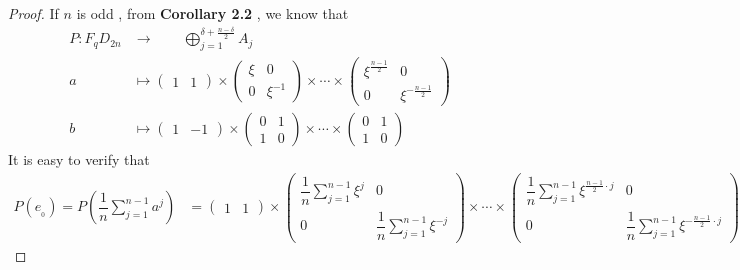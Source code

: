 \documentclass{article}
\begin{document}
\begin{proof}
    If $n$ is odd , from \textbf{Corollary 2.2} , we know that
    \begin{align*}
        P:F_qD_{2n}&\longrightarrow\qquad\mathop{\bigoplus}\limits_{j=1}^{\delta+\frac{n-\delta}{2}}A_j\\
        a\quad&\longmapsto\begin{pmatrix}
            1&1
        \end{pmatrix}
        \times
        \begin{pmatrix}
            \xi&0\\
            0&\xi^{\scriptscriptstyle-1}
        \end{pmatrix}
        \times\cdots\times
        \begin{pmatrix}
            \xi^{\frac{n-1}{2}}&0\\
            0&\xi^{-\frac{n-1}{2}}
        \end{pmatrix}\\
        b\quad&\longmapsto\begin{pmatrix}
            1&-1
        \end{pmatrix}
        \times
        \begin{pmatrix}
            0&1\\
            1&0
        \end{pmatrix}
         \times\cdots\times
        \begin{pmatrix}
            0&1\\
            1&0
        \end{pmatrix}
    \end{align*}
    It is easy to verify that
    \begin{align*}
    P(e_{_0})=P(\dfrac{1}{n}\sum_{j=1}^{n-1}a^{j})&=\begin{pmatrix}
        1&1
    \end{pmatrix}
    \times
        \begin{pmatrix}
            \dfrac{1}{n}\sum\limits_{j=1}^{n-1}\xi^{\scriptscriptstyle j}&0\\
            0&\dfrac{1}{n}\sum\limits_{j=1}^{n-1}\xi^{\scriptscriptstyle-j}
        \end{pmatrix}
        \times\cdots\times
        \begin{pmatrix}
            \dfrac{1}{n}\sum\limits_{j=1}^{n-1}\xi^{\scriptscriptstyle\frac{n-1}{2}\cdot j}&0\\
            0&\dfrac{1}{n}\sum\limits_{j=1}^{n-1}\xi^{\scriptscriptstyle-\frac{n-1}{2}\cdot j}

\end{pmatrix}
\end{align*}
\end{proof}
\end{document}
